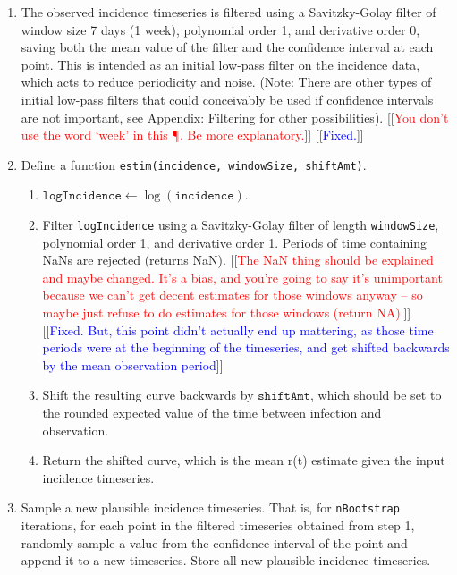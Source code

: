 \documentclass{article}
\newcommand{\code}[1]{\texttt{#1}}
\newcommand{\jd}[1]{[[\textcolor{red}{#1}]]}  \newcommand{\msComment}[1]{[[\textcolor{blue}{#1}]]}
\newcommand{\jd}[1]{} \newcommand{\msComment}[1]{}
\begin{document}
\begin{enumerate}
	\item The observed incidence timeseries is filtered using a Savitzky-Golay filter of window size 7 days (1 week), polynomial order 1, and derivative order 0, saving both the mean value of the filter and the confidence interval at each point. This is intended as an initial low-pass filter on the incidence data, which acts to reduce periodicity and noise. (Note: There are other types of initial low-pass filters that could conceivably be used if confidence intervals are not important, see Appendix: Filtering for other possibilities).
	\jd{You don't use the word `week' in this \P. Be more explanatory.} \msComment{Fixed.}
	
	\item Define a function \code{estim(incidence, windowSize, shiftAmt)}.
		\begin{enumerate}
			\item $\code{logIncidence} \gets \log(\code{incidence})$.
			\item Filter \code{logIncidence} using a Savitzky-Golay filter of length \code{windowSize}, polynomial order 1, and derivative order 1. Periods of time containing NaNs are rejected (returns NaN).
			\jd{The NaN thing should be explained and maybe changed. It's a bias, and you're going to say it's unimportant because we can't get decent estimates for those windows anyway -- so maybe just refuse to do estimates for those windows (return NA).} \msComment{Fixed. But, this point didn't actually end up mattering, as those time periods were at the beginning of the timeseries, and get shifted backwards by the mean observation period}
			
			\item Shift the resulting curve backwards by $\code{shiftAmt}$, which should be set to the rounded expected value of the time between infection and observation. 
			\item Return the shifted curve, which is the mean r(t) estimate given the input incidence timeseries. 
		\end{enumerate}
	
	\item Sample a new plausible incidence timeseries. That is, for \code{nBootstrap} iterations, for each point in the filtered timeseries obtained from step 1, randomly sample a value from the confidence interval of the point and append it to a new timeseries. Store all new plausible incidence timeseries.
	

\end{enumerate}
\end{document}
